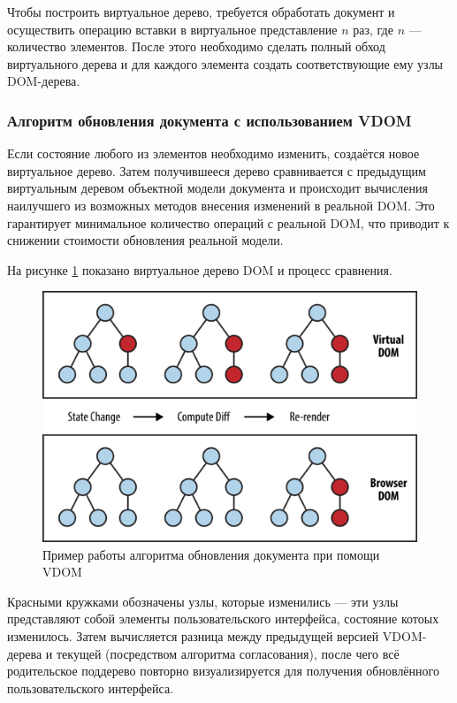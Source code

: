 Чтобы построить виртуальное дерево, требуется обработать документ и осуществить операцию вставки в виртуальное представление $n$ раз, где $n$ --- количество элементов. 
После этого необходимо сделать полный обход виртуального дерева и для каждого элемента создать соответствующие ему узлы DOM-дерева.

\subsubsection{Алгоритм обновления документа с использованием VDOM}

Если состояние любого из элементов необходимо изменить, создаётся новое виртуальное дерево.
Затем получившееся дерево сравнивается с предыдущим виртуальным деревом объектной модели документа и происходит вычисления наилучшего из возможных методов внесения изменений в реальной DOM. 
Это гарантирует минимальное количество операций с реальной DOM, что приводит к снижении стоимости обновления реальной модели. 

На рисунке \ref{fig:vdom-example} показано виртуальное дерево DOM и процесс сравнения.

\begin{figure}[h]
	\centering
	\captionsetup{justification=centering}
	\includegraphics[width=130mm]{img/vdom-example.png}
	\caption{Пример работы алгоритма обновления документа при помощи VDOM}
	\label{fig:vdom-example}
\end{figure}
\clearpage

Красными кружками обозначены узлы, которые изменились --- эти узлы представляют собой элементы пользовательского интерфейса, состояние котоых изменилось.
Затем вычисляется разница между предыдущей версией VDOM-дерева и текущей (посредством алгоритма согласования), после чего всё родительское поддерево повторно визуализируется для получения обновлённого пользовательского интерфейса.

